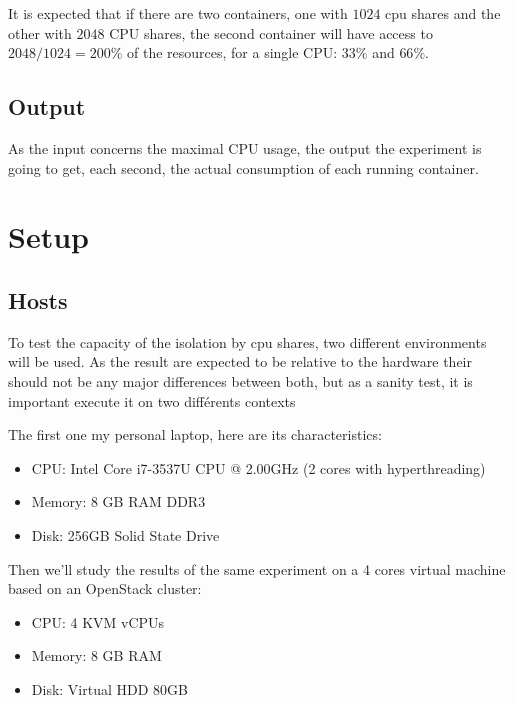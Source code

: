 It is expected that if there are two containers, one with $1024$ cpu shares and
the other with $2048$ CPU shares, the second container will have access to
$2048/1024 = 200\%$ of the resources, for a single CPU: $33\%$ and $66\%$.

\subsection{Output}

As the input concerns the maximal CPU usage, the output the experiment is going
to get, each second, the actual consumption of each running container.

\section{Setup}

\subsection{Hosts}

To test the capacity of the isolation by cpu shares, two different environments
will be used. As the result are expected to be relative to the hardware their
should not be any major differences between both, but as a sanity test, it is
important execute it on two différents contexts

The first one my personal laptop, here are its characteristics:

\begin{itemize}
	\item{CPU: Intel\textregistered \hspace{1pt} Core\texttrademark
	\hspace{1pt} i7-3537U CPU @ 2.00GHz (2 cores with hyperthreading)}
	\item{Memory: 8 GB RAM DDR3}
	\item{Disk: 256GB Solid State Drive}
\end{itemize}

Then we'll study the results of the same experiment on a 4 cores virtual
machine based on an OpenStack cluster:

\begin{itemize}
	\item{CPU: 4 KVM vCPUs}
	\item{Memory: 8 GB RAM}
	\item{Disk: Virtual HDD 80GB}
\end{itemize}

